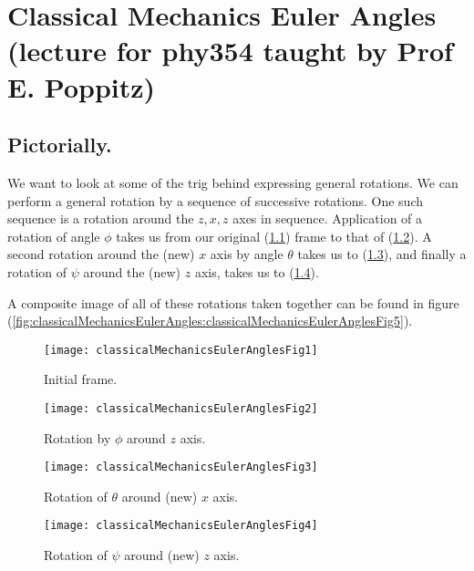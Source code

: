 
%

\chapter{Classical Mechanics Euler Angles (lecture for phy354 taught by Prof E. Poppitz)}
\label{chap:classicalMechanicsEulerAngles}
{}
\date{Mar 21, 2012}

\beginArtWithToc

\section{Pictorially.}

We want to look at some of the trig behind expressing general rotations.  We can perform a general rotation by a sequence of successive rotations.  One such sequence is a rotation around the $z,x,z$ axes in sequence.  Application of a rotation of angle $\phi$ takes us from our original (\ref{fig:classicalMechanicsEulerAngles:classicalMechanicsEulerAnglesFig1}) frame to that of (\ref{fig:classicalMechanicsEulerAngles:classicalMechanicsEulerAnglesFig2}).  A second rotation around the (new) $x$ axis by angle $\theta$ takes us to (\ref{fig:classicalMechanicsEulerAngles:classicalMechanicsEulerAnglesFig3}), and finally a rotation of $\psi$ around the (new) $z$ axis, takes us to (\ref{fig:classicalMechanicsEulerAngles:classicalMechanicsEulerAnglesFig4}).

A composite image of all of these rotations taken together can be found in figure (\ref{fig:classicalMechanicsEulerAngles:classicalMechanicsEulerAnglesFig5}).

\begin{figure}[htp]
   \centering
   \texttt{[image: classicalMechanicsEulerAnglesFig1]}
   \caption{Initial frame.}\label{fig:classicalMechanicsEulerAngles:classicalMechanicsEulerAnglesFig1}
\end{figure}
\begin{figure}[htp]
   \centering
   \texttt{[image: classicalMechanicsEulerAnglesFig2]}
   \caption{Rotation by $\phi$ around $z$ axis.}\label{fig:classicalMechanicsEulerAngles:classicalMechanicsEulerAnglesFig2}
\end{figure}
\begin{figure}[htp]
   \centering
   \texttt{[image: classicalMechanicsEulerAnglesFig3]}
   \caption{Rotation of $\theta$ around (new) $x$ axis.}\label{fig:classicalMechanicsEulerAngles:classicalMechanicsEulerAnglesFig3}
\end{figure}
\begin{figure}[htp]
   \centering
   \texttt{[image: classicalMechanicsEulerAnglesFig4]}
   \caption{Rotation of $\psi$ around (new) $z$ axis.}\label{fig:classicalMechanicsEulerAngles:classicalMechanicsEulerAnglesFig4}
\end{figure}

